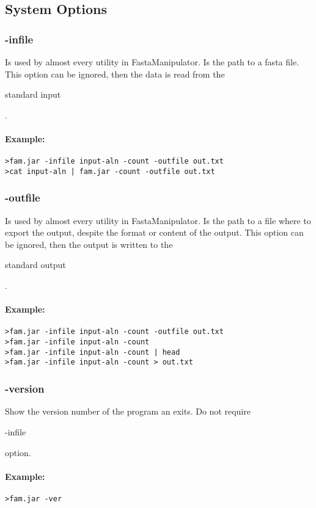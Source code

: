 \documentclass[a4paper, twoside,10pt]{article}
\begin{document}
\subsection{System Options}
\subsubsection{-infile}
Is used by almost every utility in FastaManipulator. Is the path to a fasta 
file. This option can be ignored, then the data is read from the \begin{tt}
standard input\end{tt}. 

\paragraph{Example:}
\begin{verbatim}
>fam.jar -infile input-aln -count -outfile out.txt
>cat input-aln | fam.jar -count -outfile out.txt
\end{verbatim}

\subsubsection{-outfile}
Is used by almost every utility in FastaManipulator. Is the path to a file where 
to export the output, despite the format or content of the output. This option 
can be ignored, then the output is written to the \begin{tt}
standard output\end{tt}. 

\paragraph{Example:}
\begin{verbatim}
>fam.jar -infile input-aln -count -outfile out.txt
>fam.jar -infile input-aln -count 
>fam.jar -infile input-aln -count | head
>fam.jar -infile input-aln -count > out.txt
\end{verbatim}

\subsubsection{-version}
Show the version number of the program an exits. Do not require \begin{tt}
-infile\end{tt} option. 

\paragraph{Example:}
\begin{verbatim}
>fam.jar -ver
\end{verbatim}
\end{document}
